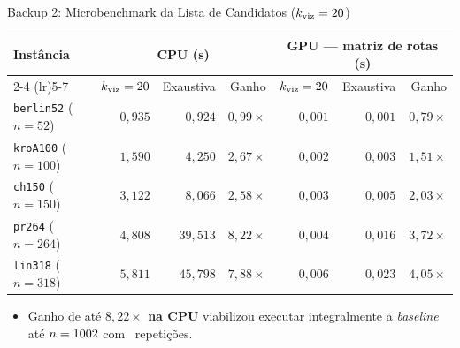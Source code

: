 \begin{frame}{Backup 2: Microbenchmark da Lista de Candidatos ($k_{\text{viz}} = 20$)}
  \begin{slidetabela}[0.54\textheight]
    \begin{tabular}{@{}lrrrrrr@{}}
      \toprule
      \textbf{Instância} & \multicolumn{3}{c}{\textbf{CPU (s)}} & \multicolumn{3}{c}{\textbf{GPU — matriz de rotas (s)}} \\
      \cmidrule(lr){2-4} \cmidrule(lr){5-7}
       & $k_{\text{viz}} = 20$ & Exaustiva & Ganho & $k_{\text{viz}} = 20$ & Exaustiva & Ganho \\
      \midrule
      \texttt{berlin52} ($n=52$) & $0{,}935$ & $0{,}924$  & $0{,}99\times$         & $0{,}001$ & $0{,}001$ & $0{,}79\times$ \\
      \texttt{kroA100} ($n=100$) & $1{,}590$ & $4{,}250$  & $2{,}67\times$         & $0{,}002$ & $0{,}003$ & $1{,}51\times$ \\
      \texttt{ch150} ($n=150$)   & $3{,}122$ & $8{,}066$  & $2{,}58\times$         & $0{,}003$ & $0{,}005$ & $2{,}03\times$ \\
      \texttt{pr264} ($n=264$)   & $4{,}808$ & $39{,}513$ & \textbf{$8{,}22\times$} & $0{,}004$ & $0{,}016$ & $3{,}72\times$ \\
      \texttt{lin318} ($n=318$)  & $5{,}811$ & $45{,}798$ & $7{,}88\times$         & $0{,}006$ & $0{,}023$ & \textbf{$4{,}05\times$} \\
      \bottomrule
    \end{tabular}
  \end{slidetabela}

  \vspace{0.08cm}
  \begin{itemize}
    \footnotesize
    \item Ganho de até \textbf{$8{,}22\times$ na CPU} viabilizou executar integralmente a \emph{baseline} até $n = 1002$ com \totalrepeticoes\ repetições.
  \end{itemize}
\end{frame}

